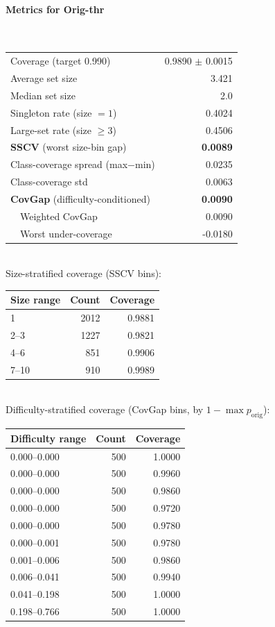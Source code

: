 \documentclass[parskip=half]{scrartcl}
\begin{document}
\paragraph{Metrics for Orig-thr}~\\
\begin{tabular}{l r}
\hline
Coverage (target 0.990) & 0.9890 $\pm$ 0.0015 \\
Average set size & 3.421 \\
Median set size & 2.0 \\
Singleton rate (size $=1$) & 0.4024 \\
Large-set rate (size $\geq 3$) & 0.4506 \\
\textbf{SSCV} (worst size-bin gap) & \textbf{0.0089} \\
Class-coverage spread (max$-$min) & 0.0235 \\
Class-coverage std & 0.0063 \\
\textbf{CovGap} (difficulty-conditioned) & \textbf{0.0090} \\
~~Weighted CovGap & 0.0090 \\
~~Worst under-coverage & -0.0180 \\
\hline
\end{tabular}\\[0.5em]
\textsf{\scriptsize Size-stratified coverage (SSCV bins):}\\
\begin{tabular}{l r r}
\hline
Size range & Count & Coverage \\
\hline
1 & 2012 & 0.9881 \\
2--3 & 1227 & 0.9821 \\
4--6 & 851 & 0.9906 \\
7--10 & 910 & 0.9989 \\
\hline
\end{tabular}\\[0.5em]
\textsf{\scriptsize Difficulty-stratified coverage (CovGap bins, by $1-\max p_{\mathrm{orig}}$):}\\
\begin{tabular}{l r r}
\hline
Difficulty range & Count & Coverage \\
\hline
0.000--0.000 & 500 & 1.0000 \\
0.000--0.000 & 500 & 0.9960 \\
0.000--0.000 & 500 & 0.9860 \\
0.000--0.000 & 500 & 0.9720 \\
0.000--0.000 & 500 & 0.9780 \\
0.000--0.001 & 500 & 0.9780 \\
0.001--0.006 & 500 & 0.9860 \\
0.006--0.041 & 500 & 0.9940 \\
0.041--0.198 & 500 & 1.0000 \\
0.198--0.766 & 500 & 1.0000 \\
\hline
\end{tabular}\\[0.5em]
\end{document}
